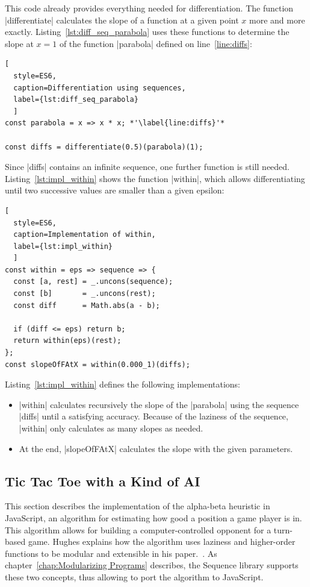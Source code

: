 This code already provides everything needed for differentiation. The function
|differentiate| calculates the slope of a function at a given point $x$ more
and more exactly.
Listing~\ref{lst:diff_seq_parabola} uses these functions to determine the 
slope at $x = 1$ of the function |parabola| defined on line~\ref{line:diffs}:

\begin{lstlisting}[
  style=ES6, 
  caption=Differentiation using sequences,
  label={lst:diff_seq_parabola}
  ]
const parabola = x => x * x; *'\label{line:diffs}'*

const diffs = differentiate(0.5)(parabola)(1);
\end{lstlisting}

Since |diffs| contains an infinite sequence, one further
function is still needed.
Listing~\ref{lst:impl_within} shows the function |within|, which allows
differentiating until two successive values are smaller than a given epsilon:

\begin{lstlisting}[
  style=ES6, 
  caption=Implementation of within,
  label={lst:impl_within}
  ]
const within = eps => sequence => {
  const [a, rest] = _.uncons(sequence);
  const [b]       = _.uncons(rest);
  const diff      = Math.abs(a - b);

  if (diff <= eps) return b;
  return within(eps)(rest);
};
const slopeOfFAtX = within(0.000_1)(diffs);
\end{lstlisting}

Listing~\ref{lst:impl_within} defines the following implementations:

\begin{itemize}
  \item |within| calculates recursively the slope of the |parabola| using the
    sequence |diffs| until a satisfying accuracy. Because of the laziness of
    the sequence, |within| only calculates as many slopes as needed.
  \item At the end, |slopeOfFAtX| calculates the slope with the given parameters.
\end{itemize}


\subsection{Tic Tac Toe with a Kind of AI}
\label{sub:Alpha - Beta Algorithm}
This section describes the implementation of the alpha-beta heuristic in
JavaScript, an algorithm for estimating how good a position a game player is
in. \\ 
This algorithm allows for building a computer-controlled opponent for a
turn-based game. Hughes explains how the algorithm uses laziness and
higher-order functions to be modular and extensible in his paper.~\cite[p.
16]{hughes_why_1989}. As chapter~\ref{chap:Modularizing Programs} describes, the
Sequence library supports these two concepts, thus allowing to port the
algorithm to JavaScript.


